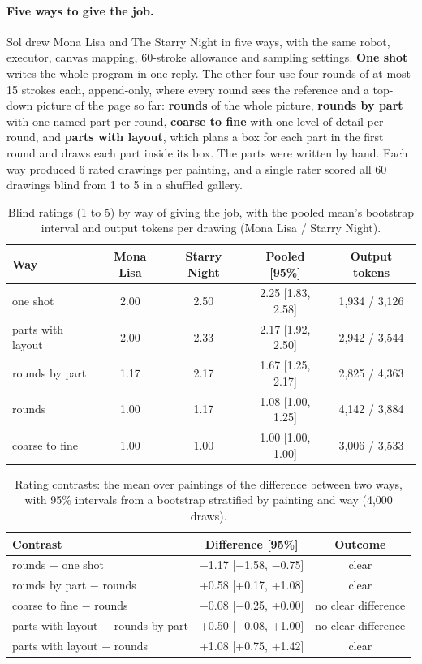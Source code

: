 \documentclass[11pt]{article}
\begin{document}
\paragraph{Five ways to give the job.} Sol drew Mona Lisa and The Starry Night in five ways, with the same robot, executor, canvas mapping, 60-stroke allowance and sampling settings. \textbf{One shot} writes the whole program in one reply. The other four use four rounds of at most 15 strokes each, append-only, where every round sees the reference and a top-down picture of the page so far: \textbf{rounds} of the whole picture, \textbf{rounds by part} with one named part per round, \textbf{coarse to fine} with one level of detail per round, and \textbf{parts with layout}, which plans a box for each part in the first round and draws each part inside its box. The parts were written by hand. Each way produced 6 rated drawings per painting, and a single rater scored all 60 drawings blind from 1 to 5 in a shuffled gallery.

\begin{table}[tbp]
\centering
\caption{Blind ratings (1 to 5) by way of giving the job, with the pooled mean's bootstrap interval and output tokens per drawing (Mona Lisa / Starry Night).}
\label{tab:ways}
\begin{tabular}{lcccc}
\toprule
Way & Mona Lisa & Starry Night & Pooled [95\%] & Output tokens \\
\midrule
one shot & 2.00 & 2.50 & 2.25 [1.83, 2.58] & 1,934 / 3,126 \\
parts with layout & 2.00 & 2.33 & 2.17 [1.92, 2.50] & 2,942 / 3,544 \\
rounds by part & 1.17 & 2.17 & 1.67 [1.25, 2.17] & 2,825 / 4,363 \\
rounds & 1.00 & 1.17 & 1.08 [1.00, 1.25] & 4,142 / 3,884 \\
coarse to fine & 1.00 & 1.00 & 1.00 [1.00, 1.00] & 3,006 / 3,533 \\
\bottomrule
\end{tabular}
\end{table}

\begin{table}[tbp]
\centering
\caption{Rating contrasts: the mean over paintings of the difference between two ways, with 95\% intervals from a bootstrap stratified by painting and way (4,000 draws).}
\label{tab:contrasts}
\begin{tabular}{lcc}
\toprule
Contrast & Difference [95\%] & Outcome \\
\midrule
rounds $-$ one shot & $-$1.17 [$-$1.58, $-$0.75] & clear \\
rounds by part $-$ rounds & +0.58 [+0.17, +1.08] & clear \\
coarse to fine $-$ rounds & $-$0.08 [$-$0.25, +0.00] & no clear difference \\
parts with layout $-$ rounds by part & +0.50 [$-$0.08, +1.00] & no clear difference \\
parts with layout $-$ rounds & +1.08 [+0.75, +1.42] & clear \\
\bottomrule
\end{tabular}
\end{table}
\end{document}
